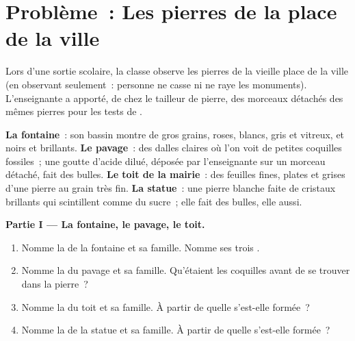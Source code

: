\section{Problème~: Les pierres de la place de la ville}

\begin{problem}
\label{pb:g6:rocks-and-minerals:1}
Lors d'une sortie scolaire, la classe observe les pierres de la vieille
place de la ville (en observant seulement~: personne ne casse ni ne raye
les monuments). L'enseignante a apporté, de chez le tailleur de pierre,
des morceaux détachés des mêmes pierres pour les tests de .

\smallskip
\noindent\textbf{La fontaine}~: son bassin montre de gros grains, roses,
        blancs, gris et vitreux, et noirs et brillants.
\textbf{Le pavage}~: des dalles claires où l'on voit de petites coquilles
        fossiles~; une goutte d'acide dilué, déposée par l'enseignante sur
        un morceau détaché, fait des bulles.
\textbf{Le toit de la mairie}~: des feuilles fines, plates et grises d'une
        pierre au grain très fin.
\textbf{La statue}~: une pierre blanche faite de cristaux brillants qui
        scintillent comme du sucre~; elle fait des bulles, elle aussi.

\medskip
\noindent\textbf{Partie I --- La fontaine, le pavage, le toit.}
\begin{enumerate}
  \item Nomme la  de la fontaine et sa famille. Nomme ses trois
        .
  \item Nomme la  du pavage et sa famille. Qu'étaient les coquilles
        avant de se trouver dans la pierre~?
  \item Nomme la  du toit et sa famille. À partir de quelle 
        s'est-elle formée~?
  \item Nomme la  de la statue et sa famille. À partir de quelle 
        s'est-elle formée~?
\end{enumerate}


\end{problem}
